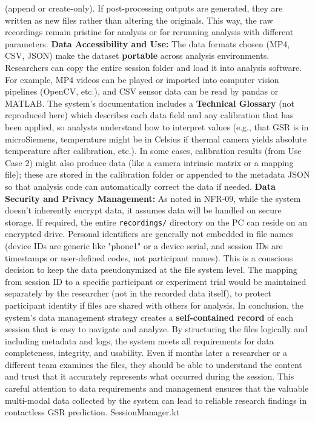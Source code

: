 (append or create-only). If post-processing outputs are generated, they are written as new files rather than altering the originals. This way, the raw recordings remain pristine for analysis or for rerunning analysis with different parameters. \textbf{Data Accessibility and Use:} The data formats chosen (MP4, CSV, JSON) make the dataset \textbf{portable} across analysis environments. Researchers can copy the entire session folder and load it into analysis software. For example, MP4 videos can be played or imported into computer vision pipelines (OpenCV, etc.), and CSV sensor data can be read by pandas or MATLAB. The system's documentation includes a \textbf{Technical Glossary} (not reproduced here) which describes each data field and any calibration that has been applied, so analysts understand how to interpret values (e.g., that GSR is in microSiemens, temperature might be in Celsius if thermal camera yields absolute temperature after calibration, etc.). In some cases, calibration results (from Use Case 2) might also produce data (like a camera intrinsic matrix or a mapping file); these are stored in the calibration folder or appended to the metadata JSON so that analysis code can automatically correct the data if needed. \textbf{Data Security and Privacy Management:} As noted in NFR-09, while the system doesn't inherently encrypt data, it assumes data will be handled on secure storage. If required, the entire \texttt{recordings/} directory on the PC can reside on an encrypted drive. Personal identifiers are generally not embedded in file names (device IDs are generic like "phone1" or a device serial, and session IDs are timestamps or user-defined codes, not participant names). This is a conscious decision to keep the data pseudonymized at the file system level. The mapping from session ID to a specific participant or experiment trial would be maintained separately by the researcher (not in the recorded data itself), to protect participant identity if files are shared with others for analysis. In conclusion, the system's data management strategy creates a \textbf{self-contained record} of each session that is easy to navigate and analyze. By structuring the files logically and including metadata and logs, the system meets all requirements for data completeness, integrity, and usability. Even if months later a researcher or a different team examines the files, they should be able to understand the content and trust that it accurately represents what occurred during the session. This careful attention to data requirements and management ensures that the valuable multi-modal data collected by the system can lead to reliable research findings in contactless GSR prediction. SessionManager.kt 